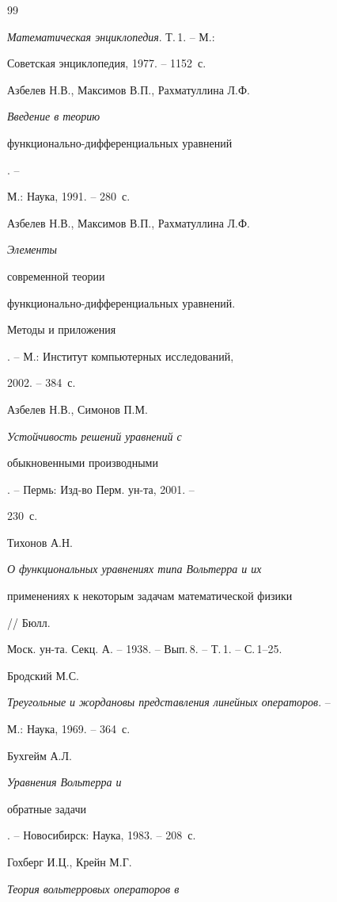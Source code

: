 \begin{thebibliography}{99}







{\em Математическая энциклопедия}. Т.\,1. -- М.:


Советская энциклопедия, 1977. -- 1152~с.




Азбелев Н.В., Максимов В.П., Рахматуллина Л.Ф. {\em Введение в теорию


функционально-дифференциальных уравнений}. --


М.: Наука, 1991. -- 280~с.




Азбелев Н.В., Максимов В.П., Рахматуллина Л.Ф. {\em Элементы


современной теории


функционально-дифференциальных уравнений.


Методы и приложения}. -- М.: Институт компьютерных исследований,


2002. -- 384~с.




Азбелев Н.В., Симонов П.М. {\em Устойчивость решений уравнений с


обыкновенными производными}. -- Пермь: Изд-во Перм. ун-та, 2001. --


230~с.




Тихонов А.Н. {\em О функциональных уравнениях типа Вольтерра и их


применениях к некоторым задачам математической физики} // Бюлл.


Моск. ун-та. Секц. А. -- 1938. -- Вып.\,8. -- Т.\,1. -- С.\,1--25.




Бродский М.С.


{\em Треугольные и жордановы представления линейных операторов}. --


М.: Наука, 1969. -- 364~с.




Бухгейм А.Л. {\em Уравнения Вольтерра и


обратные задачи}. -- Новосибирск: Наука, 1983. -- 208~с.




Гохберг И.Ц., Крейн М.Г. {\em Теория вольтерровых операторов в


}
\end{thebibliography}
